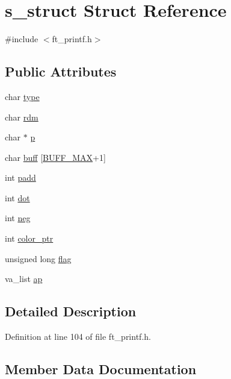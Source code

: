 \hypertarget{structs__struct}{}\section{s\+\_\+struct Struct Reference}
\label{structs__struct}


{\ttfamily \#include $<$ft\+\_\+printf.\+h$>$}

\subsection*{Public Attributes}
\begin{DoxyCompactItemize}
\item 
char \hyperlink{structs__struct_ab8c0632b6294515ba029b3cb3efa71da}{type}
\item 
char \hyperlink{structs__struct_ae9c5f8011938c4b363b04995563a2fc6}{rdm}
\item 
char $\ast$ \hyperlink{structs__struct_a13dc65f84777d75bdc5cab593f16ba95}{p}
\item 
char \hyperlink{structs__struct_adcd00abc87c5d6f476aea0789f7c93cf}{buff} \mbox{[}\hyperlink{ft__printf_8h_a2c1c653e45c4962f05cb6341f359707d}{B\+U\+F\+F\+\_\+\+M\+AX}+1\mbox{]}
\item 
int \hyperlink{structs__struct_aa1956d6e75a6d5a101336449b7ab3f73}{padd}
\item 
int \hyperlink{structs__struct_a2da26f30dd3dd4c14ff9902f223df69f}{dot}
\item 
int \hyperlink{structs__struct_ace92ae76259d4ffe5e9d8a01d6548127}{neg}
\item 
int \hyperlink{structs__struct_a61adcf84dcc399fc85f607331ed5514f}{color\+\_\+ptr}
\item 
unsigned long \hyperlink{structs__struct_a99c5b7755906c47bd6c46659fa55436a}{flag}
\item 
va\+\_\+list \hyperlink{structs__struct_a921fac3a3ba8b5061b0b67186db0ffbe}{ap}
\end{DoxyCompactItemize}


\subsection{Detailed Description}


Definition at line 104 of file ft\+\_\+printf.\+h.



\subsection{Member Data Documentation}
\mbox{\label{structs__struct_a921fac3a3ba8b5061b0b67186db0ffbe}} 
